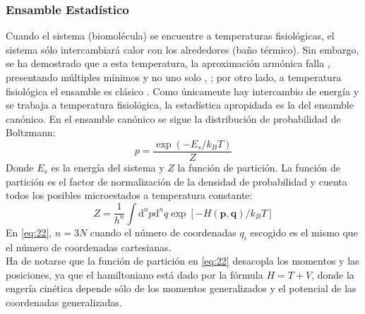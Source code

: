 \subsubsection{Ensamble Estad\'{i}stico}
Cuando el sistema (biomol\'{e}cula) se encuentre a temperaturas fisiol\'{o}gicas, el sistema  s\'{o}lo intercambiar\'{a} calor con los alrededores (ba\~{n}o t\'{e}rmico). Sin embargo, se ha demostrado  que a esta temperatura, la aproximaci\'{o}n arm\'{o}nica falla , presentando m\'{u}ltiples m\'{i}nimos y no uno solo \cite{Hayward2008}, \cite{Elber1987}; por otro lado, a temperatura fisiol\'{o}gica el ensamble es cl\'{a}sico \cite{Sethna2006}. Como \'{u}nicamente hay intercambio de energ\'{i}a y se trabaja a temperatura fisiol\'{o}gica, la estad\'{i}stica apropidada es la del ensamble can\'{o}nico. En el ensamble  can\'{o}nico se sigue la distribuci\'{o}n de probabilidad de Boltzmann:
\begin{equation}\label{eq:21}
p=\frac{\exp(-E_s/k_BT)}{Z}
\end{equation}
Donde $E_s$ es la energ\'{i}a del sistema y $Z$ la funci\'{o}n de partici\'{o}n. La funci\'{o}n de partici\'{o}n es el factor de normalizaci\'{o}n de la densidad de probabilidad y cuenta todos los posibles microestados a temperatura constante:
\begin{equation}\label{eq:22}
Z=\frac{1}{h^{n}}\int \mathrm{d}^n p\mathrm{d}^n q \exp \left [-H(\mathbf{p},\mathbf{q})/k_BT \right]
\end{equation}
En \eqref{eq:22}, $n=3N$ cuando el n\'{u}mero de coordenadas $q_i$ escogido es el mismo que el n\'{u}mero de coordenadas cartesianas.\\
Ha de notarse que la funci\'{o}n de partici\'{o}n en \eqref{eq:22} desacopla los momentos y las posiciones, ya que el hamiltoniano est\'{a} dado por la f\'{o}rmula $H=T+V$, donde la enger\'{i}a cin\'{e}tica depende s\'{o}lo de los momentos generalizados y  el potencial de las coordenadas generalizadas.\\

